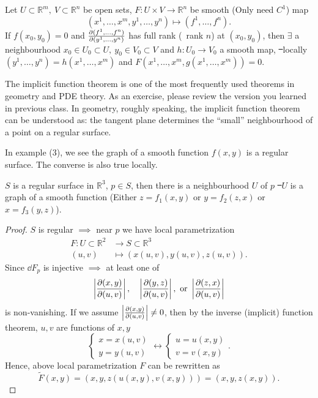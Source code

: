 \begin{theorem}
    Let \(U\subset \mathbb{R}^m,\ V\subset \mathbb{R}^n\) be open sets,
    \(F\colon U\times V\to \mathbb{R}^n\) be smooth (Only need \(C^1\)) map \[
        (x^1,\ldots,x^m,y^1,\ldots,y^n)\mapsto (f^1,\ldots,f^n)
    .\] If \(f(x_0,y_0)=0\) and \(\pdv{(f^1,\ldots,f^n)}{(y^1,\ldots,y^n)}\)
    has full rank (\ie\ rank \(n\)) at \((x_0,y_0)\), then \(\exists\) a
    neighbourhood \(x_0\in U_0\subset U,\ y_0\in V_0\subset V\) and \(h\colon U_0
    \to V_0\) a smooth map, \st\ locally \((y^1,\ldots,y^n)=h(x^1,\ldots,x^m)\) and 
    \(F(x^1,\ldots,x^m,g(x^1,\ldots,x^m))=0\).
\end{theorem}

\begin{remark}
    The implicit function theorem is one of the most frequently used theorems
    in geometry and PDE theory. As an exercise, please review the version you learned
    in previous class. In geometry, roughly speaking, the implicit function theorem
    can be understood as: the tangent plane determines the ``small'' neighbourhood
    of a point on a regular surface.
\end{remark}

In example (3), we see the graph of a smooth function \(f(x,y)\) is a regular
surface. The converse is also true locally.
\begin{prop}
    \(S\) is a regular surface in \(\mathbb{R}^3\), \(p\in S\), then there is a
    neighbourhood \(U\) of \(p\) \st\ \(U\) is a graph of a smooth function
    (Either \(z=f_1(x,y)\) or \(y=f_2(z,x)\) or \(x=f_3(y,z)\)).
\end{prop}
\begin{proof}
    \(S\) is regular \(\implies \) near \(p\) we have local parametrization
    \begin{align*}
        F\colon U\subset \mathbb{R}^2 &\longrightarrow S\subset \mathbb{R}^3 \\
        (u,v) &\longmapsto (x(u,v),y(u,v),z(u,v))
    .\end{align*}
    Since \(\dd{F_p}\) is injective \(\implies \) at least one of \[
        \left|\pdv{(x,y)}{(u,v)}\right|,\quad
        \left|\pdv{(y,z)}{(u,v)}\right|,\ 
        \text{or }\left|\pdv{(z,x)}{(u,v)}\right|
    \] is non-vanishing.
    If we assume \(\left|\pdv{(x,y)}{(u,v)}\right|\neq 0\), then by the inverse
    (implicit) function theorem, \(u,v\) are functions of \(x,y\) \ie\ \[
        \begin{cases}
            x=x(u,v) \\
            y=y(u,v)
        \end{cases}\longleftrightarrow
        \begin{cases}
            u=u(x,y) \\
            v=v(x,y)
        \end{cases}
    .\] Hence, above local parametrization \(F\) can be rewritten as \[
        \tilde{F}(x,y)=(x,y,z(u(x,y),v(x,y)))=(x,y,z(x,y)).
    \] 
\end{proof}

